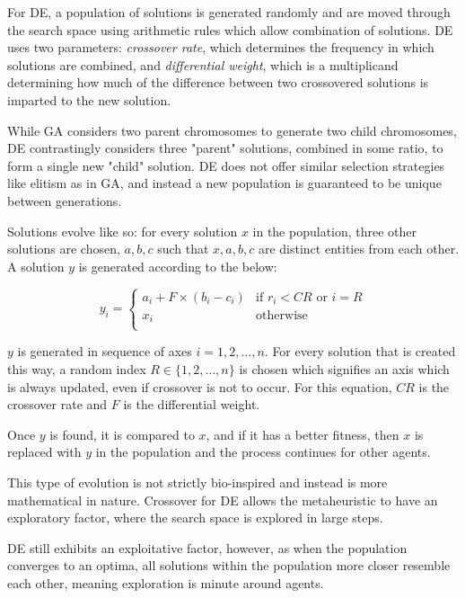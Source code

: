 \documentclass[a4paper,12pt]{article}
\begin{document}
For DE, a population of solutions is generated randomly and are moved through the search space using arithmetic rules which allow combination of solutions. DE uses two parameters: \textit{crossover rate}, which determines the frequency in which solutions are combined, and \textit{differential weight}, which is a multiplicand determining how much of the difference between two crossovered solutions is imparted to the new solution.

While GA considers two parent chromosomes to generate two child chromosomes, DE contrastingly considers three "parent" solutions, combined in some ratio, to form a single new "child" solution. DE does not offer similar selection strategies like elitism as in GA, and instead a new population is guaranteed to be unique between generations.

\pagebreak

Solutions evolve like so: for every solution $x$ in the population, three other solutions are chosen, $a, b, c$ such that $x, a, b, c$ are distinct entities from each other. A solution $y$ is generated according to the below:

\[
    y_i =
    \begin{cases}
        a_i + F \times (b_i - c_i) & \text{if $r_i < CR$ or $i = R$} \\
        x_i & \text{otherwise} \\
    \end{cases}
\]

$y$ is generated in sequence of axes $i = 1, 2, \dots, n$. For every solution that is created this way, a random index $R \in \{1, 2, \dots, n\}$ is chosen which signifies an axis which is always updated, even if crossover is not to occur. For this equation, $CR$ is the crossover rate and $F$ is the differential weight.

Once $y$ is found, it is compared to $x$, and if it has a better fitness, then $x$ is replaced with $y$ in the population and the process continues for other agents.

This type of evolution is not strictly bio-inspired and instead is more mathematical in nature. Crossover for DE allows the metaheuristic to have an exploratory factor, where the search space is explored in large steps.

DE still exhibits an exploitative factor, however, as when the population converges to an optima, all solutions within the population more closer resemble each other, meaning exploration is minute around agents.
\end{document}
